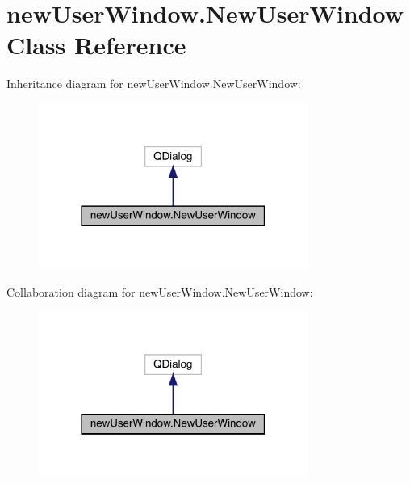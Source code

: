 \hypertarget{classnew_user_window_1_1_new_user_window}{}\section{new\+User\+Window.\+New\+User\+Window Class Reference}
\label{classnew_user_window_1_1_new_user_window}


Inheritance diagram for new\+User\+Window.\+New\+User\+Window\+:\nopagebreak
\begin{figure}[H]
\begin{center}
\leavevmode
\includegraphics[width=250pt]{classnew_user_window_1_1_new_user_window__inherit__graph}
\end{center}
\end{figure}


Collaboration diagram for new\+User\+Window.\+New\+User\+Window\+:\nopagebreak
\begin{figure}[H]
\begin{center}
\leavevmode
\includegraphics[width=250pt]{classnew_user_window_1_1_new_user_window__coll__graph}
\end{center}
\end{figure}
